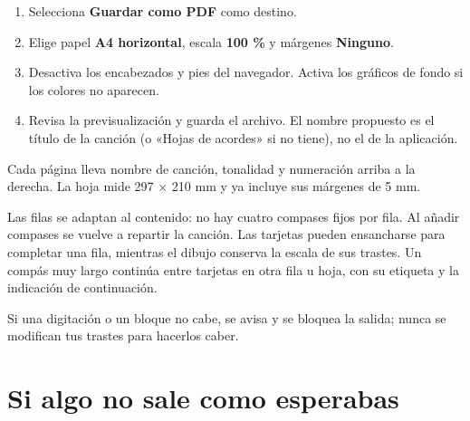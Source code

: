 \documentclass[a4paper,11pt]{article}
\let\originaltexttt\texttt
\renewcommand{\texttt}[1]{\originaltexttt{\seqsplit{#1}}}
\providecommand{\tightlist}{\setlength{\itemsep}{2pt}\setlength{\parskip}{0pt}}
\begin{document}
\begin{enumerate}
\def\labelenumi{\arabic{enumi}.}
\tightlist
\item
  Selecciona \textbf{Guardar como PDF} como destino.
\item
  Elige papel \textbf{A4 horizontal}, escala \textbf{100 \%} y márgenes
  \textbf{Ninguno}.
\item
  Desactiva los encabezados y pies del navegador. Activa los gráficos de
  fondo si los colores no aparecen.
\item
  Revisa la previsualización y guarda el archivo. El nombre propuesto es
  el título de la canción (o «Hojas de acordes» si no tiene), no el de
  la aplicación.
\end{enumerate}

Cada página lleva nombre de canción, tonalidad y numeración
\texttt{actual/total} arriba a la derecha. La hoja mide 297 × 210 mm y
ya incluye sus márgenes de 5 mm.

Las filas se adaptan al contenido: no hay cuatro compases fijos por
fila. Al añadir compases se vuelve a repartir la canción. Las tarjetas
pueden ensancharse para completar una fila, mientras el dibujo conserva
la escala de sus trastes. Un compás muy largo continúa entre tarjetas en
otra fila u hoja, con su etiqueta y la indicación de continuación.

Si una digitación o un bloque no cabe, se avisa y se bloquea la salida;
nunca se modifican tus trastes para hacerlos caber.

\Needspace{3.5cm}
\section{Si algo no sale como
esperabas}\label{si-algo-no-sale-como-esperabas}
\end{document}
